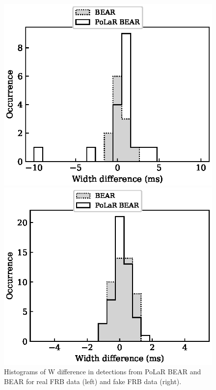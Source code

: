 \begin{figure}
    \centering
    \begin{minipage}{0.5\textwidth}
        \includegraphics[width=\textwidth]{Graphs/frbwdiff.eps}
    \end{minipage}%
    \begin{minipage}{0.5\textwidth}
        \includegraphics[width=\textwidth]{Graphs/fakewdiff.eps}
    \end{minipage}
    \caption[Histograms of W difference]{Histograms of W difference in detections from PoLaR BEAR and BEAR for real FRB data (left) and fake FRB data (right).}
    \label{fig:wdiff}
\end{figure}

